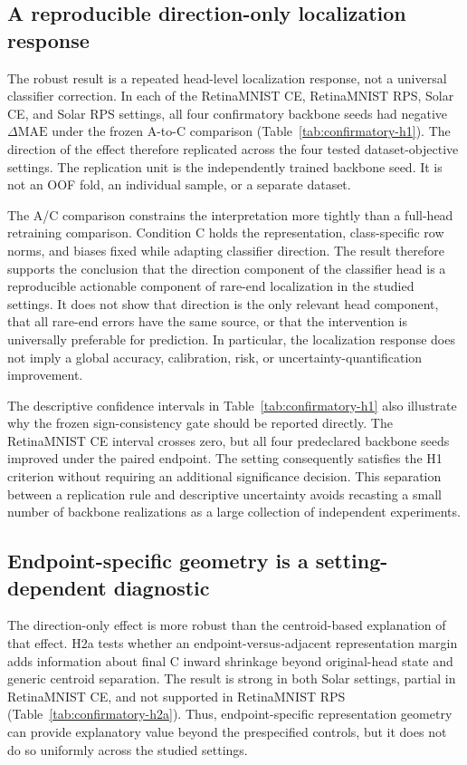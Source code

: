 \subsection{A reproducible direction-only localization response}

The robust result is a repeated head-level localization response, not a
universal classifier correction. In each of the RetinaMNIST CE, RetinaMNIST
RPS, Solar CE, and Solar RPS settings, all four confirmatory backbone seeds
had negative $\Delta\mathrm{MAE}$ under the frozen A-to-C comparison
(Table~\ref{tab:confirmatory-h1}). The direction of the effect therefore
replicated across the four tested dataset-objective settings. The replication
unit is the independently trained backbone seed. It is not an OOF fold, an
individual sample, or a separate dataset.

The A/C comparison constrains the interpretation more tightly than a full-head
retraining comparison. Condition C holds the representation, class-specific
row norms, and biases fixed while adapting classifier direction. The result
therefore supports the conclusion that the direction component of the
classifier head is a reproducible actionable component of rare-end localization
in the studied settings. It does not show that direction is the only relevant
head component, that all rare-end errors have the same source, or that the
intervention is universally preferable for prediction. In particular, the
localization response does not imply a global accuracy, calibration, risk, or
uncertainty-quantification improvement.

The descriptive confidence intervals in Table~\ref{tab:confirmatory-h1} also
illustrate why the frozen sign-consistency gate should be reported directly.
The RetinaMNIST CE interval crosses zero, but all four predeclared backbone
seeds improved under the paired endpoint. The setting consequently satisfies
the H1 criterion without requiring an additional significance decision. This
separation between a replication rule and descriptive uncertainty avoids
recasting a small number of backbone realizations as a large collection of
independent experiments.

\subsection{Endpoint-specific geometry is a setting-dependent diagnostic}

The direction-only effect is more robust than the centroid-based explanation of
that effect. H2a tests whether an endpoint-versus-adjacent representation margin
adds information about final C inward shrinkage beyond original-head state and
generic centroid separation. The result is strong in both Solar settings,
partial in RetinaMNIST CE, and not supported in RetinaMNIST RPS
(Table~\ref{tab:confirmatory-h2a}). Thus, endpoint-specific representation
geometry can provide explanatory value beyond the prespecified controls, but
it does not do so uniformly across the studied settings.


